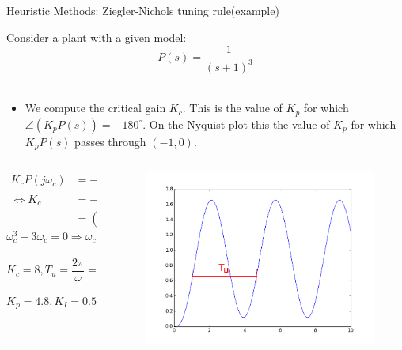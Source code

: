 \begin{frame}{Heuristic Methods: Ziegler-Nichols tuning rule(example)}
	\vspace{-1em}
	\footnotesize{
	\begin{example}
		Consider a plant with a given model:\\
		\vspace{-0.5em}
			$$ P(s) = \frac{1}{(s+1)^3} $$\\
			\vspace{-0.7em}
			\begin{itemize}
				\item We compute the critical gain $K_c$. This is the value of $K_p$ for which $\angle (K_p P(s)) = - 180^\circ$. On the Nyquist plot this the value of $K_p$ for which $K_p P(s)$ passes through $(-1,0)$.\\
			\end{itemize}
				\vspace{-1.5em}
				\begin{columns}
					\begin{column}{0.5 \textwidth}
							\begin{align*}
							K_cP(j\omega_c) &= -1 \\ \Leftrightarrow K_c &= 	-(j\omega_c + 1)^3 \\
								& = (3\omega_c^2-1)+j(\omega_c^3 - 3\omega_c)
							\end{align*}
								\vspace{-1.5em}
								$$ \omega_c^3-3\omega_c = 0 \Rightarrow \omega_c = \sqrt{3}$$\\
								\vspace{-1.5em}
								$$K_c = 8, T_u = \frac{2\pi}{\omega} = 3.628$$\\
								\vspace{-1.5em}
								$$K_p = 4.8, K_I = 0.551  K_p, K_d =  0.45 K_p$$
						
					\end{column}
					\begin{column}{0.4 \textwidth}
						\begin{figure}
\centering
\includegraphics[width=0.7\linewidth]{img/Z_N_PID_example}
\end{figure}

					\end{column}
				\end{columns}
			
	\end{example}}
\end{frame}
